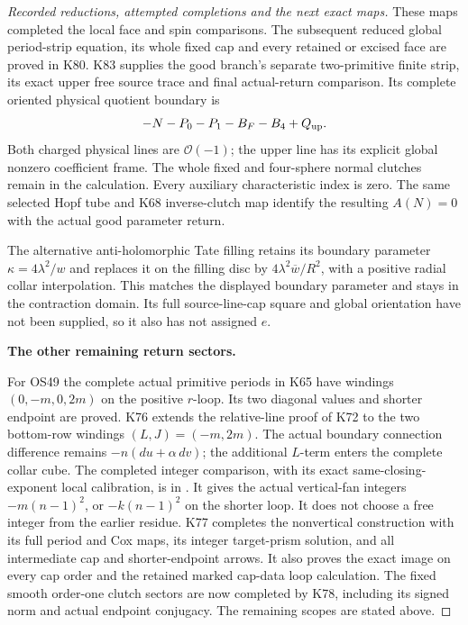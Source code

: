 \begin{proof}[Recorded reductions, attempted completions and the next exact maps]
These maps completed the local face and spin comparisons.
The subsequent reduced global period-strip equation, its whole
fixed cap and every retained or excised face are proved in K80.
K83 supplies the good branch's separate two-primitive finite
strip, its exact upper free source trace and final actual-return
comparison. Its complete oriented physical quotient boundary is
\[
              -N-P_0-P_1-B_F-B_4+Q_{\rm up}.
\]
Both charged physical lines are \(\mathcal O(-1)\); the upper
line has its explicit global nonzero coefficient frame. The whole
fixed and four-sphere normal clutches remain in the calculation.
Every auxiliary characteristic index is zero. The same selected
Hopf tube and K68 inverse-clutch map identify the resulting
\(A(N)=0\) with the actual good parameter return.

The alternative anti-holomorphic Tate filling retains its
boundary parameter \(\kappa=4\lambda^2/w\) and replaces
it on the filling disc by
\(4\lambda^2\overline w/R^2\), with a positive radial
collar interpolation. This matches the displayed boundary
parameter and stays in the contraction domain. Its full
source-line-cap square and global orientation have not
been supplied, so it also has not assigned \(e\).

\par\medskip\noindent\textbf{The other remaining return sectors.}\par\nopagebreak[4]
For OS49 the complete actual primitive periods in K65 have
windings \((0,-m,0,2m)\) on the positive \(r\)-loop.
Its two diagonal values and shorter endpoint are proved.
K76 extends the relative-line proof of K72 to the two
bottom-row windings \((L,J)=(-m,2m)\).
The actual boundary connection difference remains
\(-n(du+\alpha\,dv)\); the additional \(L\)-term enters
the complete collar cube. The completed integer comparison,
with its exact same-closing-exponent local calibration, is in
.
It gives the actual vertical-fan integers
\(-m(n-1)^2\), or \(-k(n-1)^2\) on the shorter loop.
It does not choose a free integer from the earlier residue.
K77 completes the nonvertical construction with its full
period and Cox maps, its integer target-prism solution,
and all intermediate cap and shorter-endpoint arrows.
It also proves the exact image on every cap order and
the retained marked cap-data loop calculation. The
fixed smooth order-one clutch sectors are now completed
by K78, including its signed norm and actual endpoint conjugacy.
The remaining scopes are stated above.


\end{proof}
